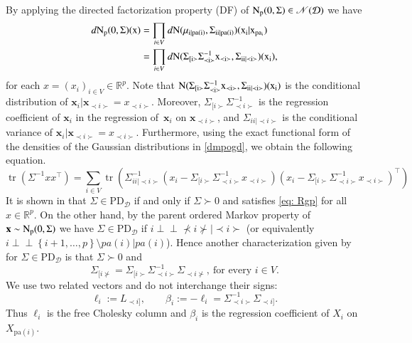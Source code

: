 \documentclass[12pt]{article}
\newcommand{\R}{\mathbb{R}}
\DeclareMathOperator{\tr}{tr}
\newcommand{\D}{\mathcal{D}}
\providecommand{\Perp}{}
\renewcommand{\Perp}{\perp\!\!\!\perp}
\theoremstyle{plain}
\theoremstyle{definition}
\theoremstyle{remark}
\begin{document}
	By applying the directed factorization property (DF) of  $\rm{N}_{p}(0, \Sigma)\in \mathscr{N}(\D)$  we  have
  \begin{align}\label{dmpogd}
	\notag d\rm{N}_{p}(0, \Sigma)(x)&=\prod_{i\in V}d\rm{N}(\mu_{i|pa(i)}, \Sigma_{ii|pa(i)})(x_{i}| x_{pa_{i}})\\
  &=\prod_{i\in V}d\rm{N}(\Sigma_{[i\succ}\Sigma^{-1}_{\prec i\succ}x_{\prec i \succ}, \Sigma_{ii|\prec i\succ})(x_i),
  \end{align}
  for each  $x=(x_i)_{i\in V}\in \R^{p}$. Note that  $\rm{N}(\Sigma_{[i\succ}\Sigma^{-1}_{\prec i\succ}x_{\prec i\succ}, \Sigma_{ii|\prec i\succ})(x_i)$  is the conditional distribution of $\mathbf{x}_{i}|\mathbf{x}_{\prec i\succ}=x_{\prec i\succ}$. Moreover, $\Sigma_{[i\succ}\Sigma^{-1}_{\prec i\succ}$ is the regression coefficient of  $\mathbf{x}_i$  in the regression of~$\mathbf{x}_i$  on  $\mathbf{x}_{\prec i\succ}$, and $\Sigma_{ii|\prec i\succ}$ is the conditional variance of $\mathbf{x}_i | \mathbf{x}_{\prec i\succ}=x_{\prec i\succ}$. Furthermore, using the exact functional form of the densities of the Gaussian distributions in \eqref{dmpogd}, we obtain the following equation.
  \begin{equation}\label{eq: Rgp}
  \tr(\Sigma^{-1}xx^{\top})=\sum_{i\in V}\tr\left(\Sigma^{-1}_{ii|\prec i\succ}(x_i-\Sigma_{[i\succ}\Sigma^{-1}_{\prec i\succ}x_{\prec i\succ}) (x_i-\Sigma_{[i\succ}\Sigma^{-1}_{\prec i\succ}x_{\prec i\succ})^{\top}\right)
  \end{equation}
  It is  shown  in \cite{andersson98} that $\Sigma\in \mathrm{PD}_{\D}$   if and only if   $\Sigma\succ 0$  and satisfies  \eqref{eq: Rgp} for all $x\in \R^{p}$. On the other hand, by the parent ordered Markov property of  $\mathbf{x}\sim \rm{N}_{p}(0, \Sigma)$ we have $\Sigma\in \mathrm{PD}_{\D}$ if $i\Perp \nprec i\nsucc |\prec  i\succ $ (or equivalently $ i\Perp \left\{i+1,\ldots, p\right\}\setminus pa(i)|pa(i)$). Hence another characterization given by \cite{andersson98} for $\Sigma\in \mathrm{PD}_{\D}$ is that $\Sigma\succ 0$  and
  \begin{equation}\label{eq:ndmp}
  \Sigma_{[i \nsucc}=\Sigma_{[i \succ}\Sigma^{-1}_{\prec  i \succ}\Sigma_{\prec i \nsucc},~ \text{for every $i\in V$.}
  \end{equation}
  We use two related vectors and do not interchange their signs:
  \[
  \ell_i:=L_{\prec i]},
  \qquad
  \beta_i:=-\ell_i
  =\Sigma_{\prec i\succ}^{-1}\Sigma_{\prec i]}.
  \]
  Thus \(\ell_i\) is the free Cholesky column and \(\beta_i\) is the
  regression coefficient of \(X_i\) on \(X_{\mathrm{pa}(i)}\).
\end{document}
